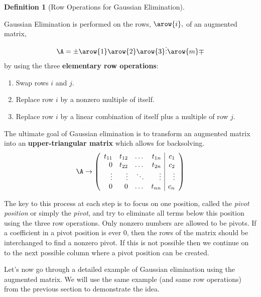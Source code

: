 \documentclass[
]{article}
\providecommand{\tightlist}{%
  \setlength{\itemsep}{0pt}\setlength{\parskip}{0pt}}
\theoremstyle{definition}
\newtheorem{definition}{Definition}[section]
\theoremstyle{definition}
\theoremstyle{definition}
\theoremstyle{definition}
\theoremstyle{remark}
\begin{document}
\begin{definition}[Row Operations for Gaussian Elimination]
\protect\hypertarget{def:rowops}{}\label{def:rowops}

Gaussian Elimination is performed on the rows, \(\arow{i},\) of an augmented matrix, \[\A = \pm \arow{1}\\\arow{2}\\\arow{3}\\\vdots\\\arow{m}\mp\] by using the three \textbf{elementary row operations}:

\begin{enumerate}
\def\labelenumi{\arabic{enumi}.}
\tightlist
\item
  Swap rows \(i\) and \(j\).
\item
  Replace row \(i\) by a nonzero multiple of itself.
\item
  Replace row \(i\) by a linear combination of itself plus a multiple of row \(j\).
\end{enumerate}

The ultimate goal of Gaussian elimination is to transform an augmented matrix into an \textbf{upper-triangular matrix} which allows for backsolving.
\[\A \rightarrow \left(\begin{array}{rrrr|r}
 t_{11}& t_{12}& \dots& t_{1n}&c_1\cr 
                                0& t_{22}& \dots& t_{2n}&c_2\cr
                                \vdots& \vdots& \ddots& \vdots&\vdots\cr
                                0& 0& \dots& t_{nn}&c_n\end{array}\right)\]

\end{definition}

The key to this process at each step is to focus on one position, called the \emph{pivot position} or simply the \emph{pivot}, and try to eliminate all terms below this position using the three row operations. Only nonzero numbers are allowed to be pivots. If a coefficient in a pivot position is ever 0, then the rows of the matrix should be interchanged to find a nonzero pivot. If this is not possible then we continue on to the next possible column where a pivot position can be created.

Let's now go through a detailed example of Gaussian elimination using the augmented matrix. We will use the same example (and same row operations) from the previous section to demonstrate the idea.
\end{document}
